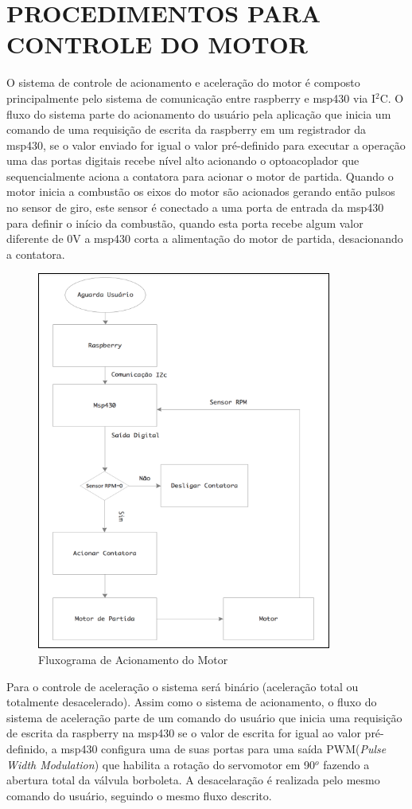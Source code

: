 \section{PROCEDIMENTOS PARA CONTROLE DO MOTOR}
O sistema de controle de acionamento e aceleração do motor é composto principalmente pelo sistema de comunicação entre raspberry e msp430 via I$^{2}$C. O fluxo do sistema parte do acionamento do usuário pela aplicação que inicia um comando de uma requisição de escrita da raspberry em um registrador da msp430, se o valor enviado for igual o valor pré-definido para executar a operação uma das portas digitais recebe nível alto acionando o optoacoplador que sequencialmente aciona a contatora para acionar o motor de partida. Quando o motor inicia a combustão os eixos do motor são acionados gerando então pulsos no sensor de giro, este sensor é conectado a uma porta de entrada da msp430 para definir o início da combustão, quando esta porta recebe algum valor diferente de 0V a msp430 corta a alimentação do motor de partida, desacionando a contatora.
\begin{figure}[h!]
	\centering
	\includegraphics[keepaspectratio=true,scale= 1.5]{figuras/fluxograma1.PNG}
	\caption{ Fluxograma de Acionamento do Motor}
	\label{ Fluxograma de Acionamento do Motor}
\end{figure}
Para o controle de aceleração o sistema será binário (aceleração total ou totalmente desacelerado). Assim como o sistema de acionamento, o fluxo do sistema de aceleração parte de um comando do usuário que inicia uma requisição de escrita da raspberry na msp430 se o valor de escrita for igual ao valor pré-definido, a msp430 configura uma de suas portas para uma saída PWM(\textit{Pulse Width Modulation}) que habilita a rotação do servomotor em 90$^{o}$ fazendo a abertura total da válvula borboleta. A desacelaração é realizada pelo mesmo comando do usuário, seguindo o mesmo fluxo descrito.
